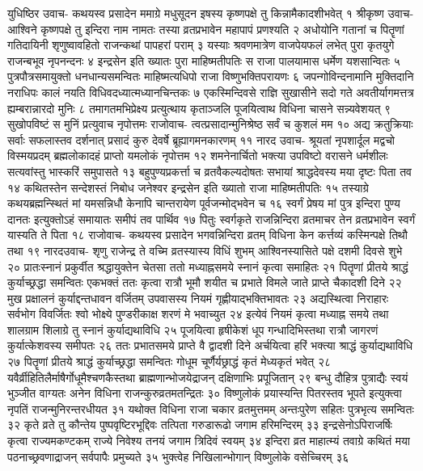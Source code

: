 युधिष्ठिर उवाच-
कथयस्व प्रसादेन ममाग्रे मधुसूदन 
इषस्य कृष्णपक्षे तु किन्नामैकादशीभवेत् १
श्रीकृष्ण उवाच-
आश्विने कृष्णपक्षे तु इन्दिरा नाम नामतः 
तस्या व्रतप्रभावेन महापापं प्रणश्यति २
अधोयोनि गतानां च पितॄणां गतिदायिनी 
शृणुष्वावहितो राजन्कथां पापहरां पराम् ३
यस्याः श्रवणमात्रेण वाजपेयफलं लभेत् 
पुरा कृतयुगे राजन्बभूव नृपनन्दनः ४
इन्द्रसेन इति ख्यातः पुरा माहिष्मतीपतिः 
स राजा पालयामास धर्मेण यशसान्वितः ५
पुत्रपौत्रसमायुक्तो धनधान्यसमन्वितः 
माहिष्मत्यधिपो राजा विष्णुभक्तिपरायणः ६
जपन्गोविन्दनामानि मुक्तिदानि नराधिपः 
कालं नयति विधिवदध्यात्मध्यानचिन्तकः ७
एकस्मिन्दिवसे राज्ञि सुखासीने सदो गते 
अवतीर्यागमत्तत्र ह्यम्बरान्नारदो मुनिः ८
तमागतमभिप्रेक्ष्य प्रत्युत्थाय कृताञ्जलि 
पूजयित्वाथ विधिना चासने सन्न्यवेशयत् ९
सुखोपविष्टं स मुनिं प्रत्युवाच नृपोत्तमः 
राजोवाच-
त्वत्प्रसादान्मुनिश्रेष्ठ सर्वं च कुशलं मम १०
अद्य क्रतुक्रियाः सर्वाः सफलास्तव दर्शनात् 
प्रसादं कुरु देवर्षे ब्रूह्यागमनकारणम् ११
नारद उवाच-
श्रूयतां नृपशार्दूल मद्वचो विस्मयप्रदम् 
ब्रह्मलोकादहं प्राप्तो यमलोकं नृपोत्तम १२
शमनेनार्चितो भक्त्या उपविष्टो वरासने 
धर्मशीलः सत्यवांस्तु भास्करिं समुपासते १३
बहुपुण्यप्रकर्त्ता च व्रतवैकल्यदोषतः 
सभायां श्राद्धदेवस्य मया दृष्टः पिता तव १४
कथितस्तेन सन्देशस्तं निबोध जनेश्वर 
इन्द्रसेन इति ख्यातो राजा माहिष्मतीपतिः १५
तस्याग्रे कथयब्रह्मन्स्थितं मां यमसन्निधौ 
केनापि चान्तरायेण पूर्वजन्मोद्भवेन च १६
स्वर्गं प्रेषय मां पुत्र इन्दिरा पुण्य दानतः 
इत्युक्तोऽहं समायातः समीपं तव पार्थिव १७
पितुः स्वर्गकृते राजन्निन्दिरा व्रतमाचर 
तेन व्रतप्रभावेन स्वर्गं यास्यति ते पिता १८
राजोवाच-
कथयस्व प्रसादेन भगवन्निन्दिरा व्रतम् 
विधिना केन कर्त्तव्यं कस्मिन्पक्षे तिथौ तथा १९
नारदउवाच-
शृणु राजेन्द्र ते वच्मि व्रतस्यास्य विधिं शुभम् 
आश्विनस्यासिते पक्षे दशमी दिवसे शुभे २०
प्रातःस्नानं प्रकुर्वीत श्रद्धायुक्तेन चेतसा 
ततो मध्याह्नसमये स्नानं कृत्वा समाहितः २१
पितॄणां प्रीतये श्राद्धं कुर्याच्छ्रद्धा समन्वितः 
एकभक्तं ततः कृत्वा रात्रौ भूमौ शयीत च 
प्रभाते विमले जाते प्राप्ते चैकादशी दिने २२
मुख प्रक्षालनं कुर्याद्दन्तधावन वर्जितम् 
उपवासस्य नियमं गृह्णीयाद्भक्तिभावतः २३
अद्यस्थित्वा निराहारः सर्वभोग विवर्जितः 
श्वो भोक्ष्ये पुण्डरीकाक्ष शरणं मे भवाच्युत २४
इत्येवं नियमं कृत्वा मध्याह्न समये तथा 
शालग्राम शिलाग्रे तु स्नानं कुर्याद्यथाविधि २५
पूजयित्वा हृषीकेशं धूप गन्धादिभिस्तथा 
रात्रौ जागरणं कुर्यात्केशवस्य समीपतः २६
ततः प्रभातसमये प्राप्ते वै द्वादशी दिने 
अर्चयित्वा हरिं भक्त्या श्राद्धं कुर्याद्यथाविधि २७
पितॄणां प्रीतये श्राद्धं कुर्याच्छ्रद्धा समन्वितः 
गोधूम चूर्णैर्यछ्राद्धं कृतं मेध्यकृतं भवेत् २८
यवैर्व्रीहितिलैर्माषैर्गोधूमैश्चणकैस्तथा 
ब्राह्मणान्भोजयेद्राजन् दक्षिणाभिः प्रपूजितान् २९
बन्धु दौहित्र पुत्राद्यैः स्वयं भुञ्जीत वाग्यतः 
अनेन विधिना राजन्कुरुव्रतमतन्द्रितः ३०
विष्णुलोकं प्रयास्यन्ति पितरस्तव भूपते 
इत्युक्त्वा नृपतिं राजन्मुनिरन्तरधीयत ३१
यथोक्त विधिना राजा चकार व्रतमुत्तमम् 
अन्तःपुरेण सहितः पुत्रभृत्य समन्वितः ३२
कृते व्रते तु कौन्तेय पुष्पवृष्टिरभूद्दिवः 
तत्पिता गरुडारूढो जगाम हरिमन्दिरम् ३३
इन्द्रसेनोऽपिराजर्षिः कृत्वा राज्यमकण्टकम् 
राज्ये निवेश्य तनयं जगाम त्रिदिवं स्वयम् ३४
इन्दिरा व्रत माहात्म्यं तवाग्रे कथितं मया 
पठनाच्छ्रवणाद्राजन् सर्वपापैः प्रमुच्यते ३५
भुक्त्वेह निखिलान्भोगान् विष्णुलोके वसेच्चिरम् ३६


